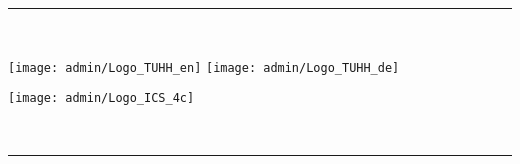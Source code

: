 \thispagestyle{empty}
\begin{titlepage}

\newcommand{\HRule}{\textcolor{darkBlue}{\rule{\textwidth}{0.4mm}}} %
\center %

{
	{
	{}}
}

\HRule \\[0.4cm]
\begin{minipage}{0.5\textwidth}
\begin{flushleft} \large
	{\texttt{[image: admin/Logo\_TUHH\_en]}}
	{\texttt{[image: admin/Logo\_TUHH\_de]}}
\end{flushleft}
\end{minipage}
\hfill
\begin{minipage}{0.4\textwidth}
\begin{flushright} \large
\texttt{[image: admin/Logo\_ICS\_4c]} %
\end{flushright}
\end{minipage}\\[0.4cm]

\HRule \\[3cm]
 {\large \textsc{\thesisname}}\\[1cm]
{\fontsize{32}{32}\selectfont
{}\par
}

\vfill


\begin{minipage}[b]{0.6\textwidth}
\begin{flushleft} \large
{}\\
\authorfirstname\, \authorfamilyname \\[1cm] %


\end{flushleft}
\end{minipage}
\end{titlepage}

